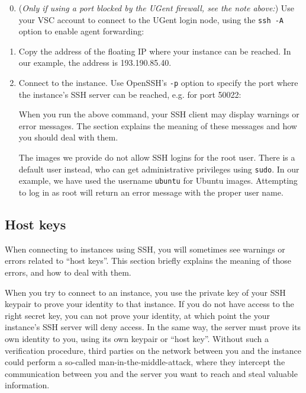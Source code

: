 \begin{enumerate}
  \setcounter{enumi}{-1}
\item (\emph{Only if using a port blocked by the UGent firewall, see
    the note above:}) Use your VSC account to connect to the UGent login
  node, using the \lstinline{ssh -A} option to enable agent
  forwarding:

  \begin{prompt}
  \end{prompt}

\item Copy the address of the floating IP where your instance can be
  reached.  In our example, the address is 193.190.85.40.

\item Connect to the instance.  Use OpenSSH's \lstinline{-p} option to
  specify the port where the instance's SSH server can be reached,
  e.g. for port 50022:

  \begin{prompt}
  \end{prompt}

  When you run the above command, your SSH client may display warnings
  or error messages.  The section 
  explains the meaning of these messages and how you should deal with
  them.

   The images we provide do not allow SSH logins for the
  root user.  There is a default user instead, who can get
  administrative privileges using \lstinline{sudo}.  In our example,
  we have used the username \lstinline{ubuntu} for Ubuntu images.
  Attempting to log in as root will return an error message with the
  proper user name.
\end{enumerate}

\subsection*{Host keys}\label{sec:host-keys}
When connecting to instances using SSH, you will sometimes see
warnings or errors related to ``host keys''.  This section briefly
explains the meaning of those errors, and how to deal with them.

When you try to connect to an instance, you use the private key of
your SSH keypair to prove your identity to that instance.  If you do
not have access to the right secret key, you can not prove your
identity, at which point the your instance's SSH server will deny
access.  In the same way, the server must prove its own identity to
you, using its own keypair or ``host key''.  Without such a
verification procedure, third parties on the network between you and
the instance could perform a so-called man-in-the-middle-attack, where
they intercept the communication between you and the server you want
to reach and steal valuable information.

